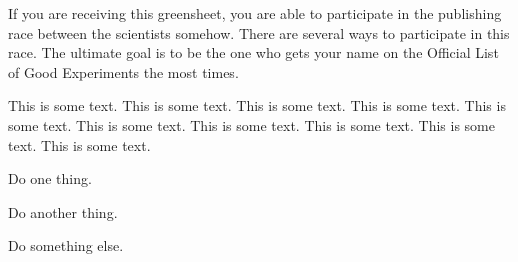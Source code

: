 \documentclass[green]{guildcamp3}
\begin{document}
	
	\name{\gSPublishing{}}
	
	
	
	
	If you are receiving this greensheet, you are able to participate in the publishing race between the scientists somehow. There are several ways to participate in this race. The ultimate goal is to be the one who gets your name on the Official List of Good Experiments the most times. 
	
	This is some text.  This is some text.  This is some text.  This is
	some text.  This is some text.  This is some text.  This is some text.
	This is some text.  This is some text.  This is some text.
	
	
	\begin{enum}[Directions]
		\item Do one thing.
		\item Do another thing.
		\item Do something else.
	\end{enum}
	
	
\end{document}
